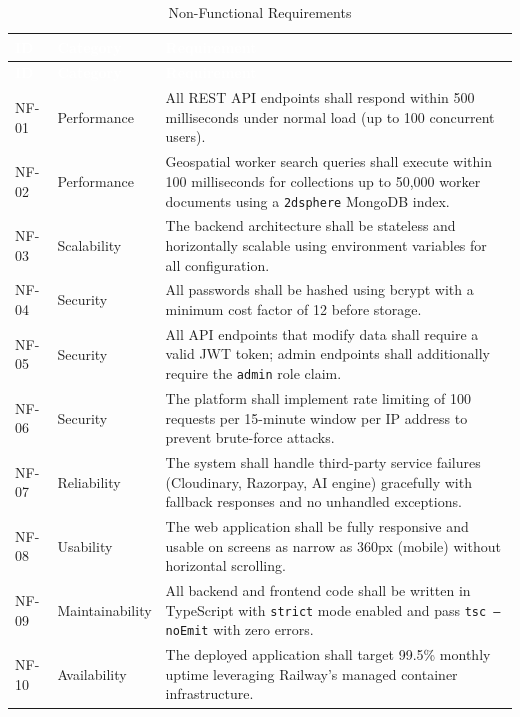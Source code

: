 \documentclass[12pt,a4paper]{report}
\newcommand{\thead}[1]{\cellcolor{tableheader}\textcolor{white}{\textbf{#1}}}
\begin{document}
\begin{longtable}{|p{0.8cm}|p{3cm}|p{9.5cm}|}
\caption{Non-Functional Requirements}\label{tab:nonfuncreq}\\
\hline
\thead{ID} & \thead{Category} & \thead{Requirement} \\
\hline
\endfirsthead
\hline
\thead{ID} & \thead{Category} & \thead{Requirement} \\
\hline
\endhead
NF-01 & Performance & All REST API endpoints shall respond within 500 milliseconds under normal load (up to 100 concurrent users). \\
\hline
NF-02 & Performance & Geospatial worker search queries shall execute within 100 milliseconds for collections up to 50,000 worker documents using a \texttt{2dsphere} MongoDB index. \\
\hline
NF-03 & Scalability & The backend architecture shall be stateless and horizontally scalable using environment variables for all configuration. \\
\hline
NF-04 & Security & All passwords shall be hashed using bcrypt with a minimum cost factor of 12 before storage. \\
\hline
NF-05 & Security & All API endpoints that modify data shall require a valid JWT token; admin endpoints shall additionally require the \texttt{admin} role claim. \\
\hline
NF-06 & Security & The platform shall implement rate limiting of 100 requests per 15-minute window per IP address to prevent brute-force attacks. \\
\hline
NF-07 & Reliability & The system shall handle third-party service failures (Cloudinary, Razorpay, AI engine) gracefully with fallback responses and no unhandled exceptions. \\
\hline
NF-08 & Usability & The web application shall be fully responsive and usable on screens as narrow as 360px (mobile) without horizontal scrolling. \\
\hline
NF-09 & Maintainability & All backend and frontend code shall be written in TypeScript with \texttt{strict} mode enabled and pass \texttt{tsc --noEmit} with zero errors. \\
\hline
NF-10 & Availability & The deployed application shall target 99.5\% monthly uptime leveraging Railway's managed container infrastructure. \\
\hline
\end{longtable}

\end{document}
